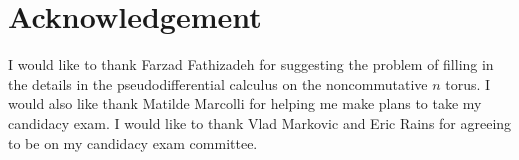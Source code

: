 \documentclass[10pt]{article}
\theoremstyle{remark}
\theoremstyle{definition}
\begin{document}
\section{Acknowledgement}
I would like to thank Farzad Fathizadeh for suggesting the problem of
filling in the details in the pseudodifferential calculus on the noncommutative
$n$ torus. I would also like thank Matilde Marcolli for helping me make plans
to take my candidacy exam. I would like to thank Vlad Markovic and Eric Rains
for agreeing to be on my candidacy exam committee.

{}

\end{document}
